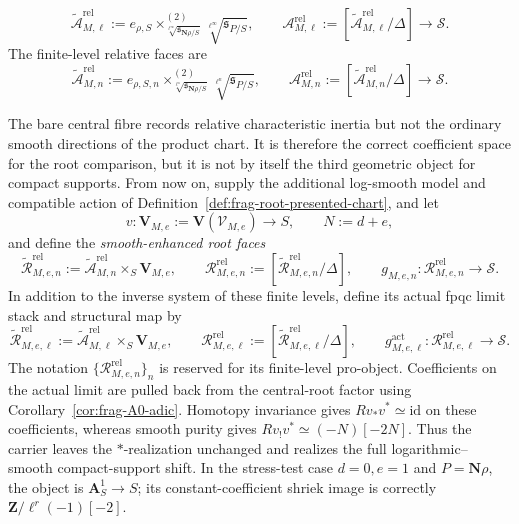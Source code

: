 \documentclass[11pt]{article}
\theoremstyle{definition}
\theoremstyle{remark}
\begin{document}
\begin{equation}
 \widetilde{\mathcal A}_{M,\ell}^{\mathrm{rel}}
 :=
 e_{\rho,S}\times^{(2)}_{\sqrt[\ell^\infty]{\mathfrak s_{\mathbf N\rho/S}}}
 \sqrt[\ell^\infty]{\mathfrak s_{P/S}},
 \qquad
 \mathcal A_{M,\ell}^{\mathrm{rel}}
 :=[\widetilde{\mathcal A}_{M,\ell}^{\mathrm{rel}}/\Delta]
 \longrightarrow\mathscr S.
 \label{eq:frag-proell-geometric-artin-face}
\end{equation}
The finite-level relative faces are
\[
 \widetilde{\mathcal A}_{M,n}^{\mathrm{rel}}
 :=
 e_{\rho,S,n}\times^{(2)}_{\sqrt[\ell^n]{\mathfrak s_{\mathbf N\rho/S}}}
 \sqrt[\ell^n]{\mathfrak s_{P/S}},
 \qquad
\mathcal A_{M,n}^{\mathrm{rel}}
 :=[\widetilde{\mathcal A}_{M,n}^{\mathrm{rel}}/\Delta]
 \longrightarrow\mathscr S.
\]

The bare central fibre records relative characteristic inertia but not the
ordinary smooth directions of the product chart.  It is therefore the correct
coefficient space for the root comparison, but it is not by itself the third geometric
object for compact supports.  From now on, supply the additional
log-smooth model and compatible action of
Definition~\ref{def:frag-root-presented-chart}, and let
\[
 v:\mathbf V_{M,e}:=\mathbf V(\mathcal V_{M,e})\longrightarrow S,
 \qquad N:=d+e,
\]
and define the \emph{smooth-enhanced root faces}
\begin{equation}
 \widetilde{\mathcal R}_{M,e,n}^{\mathrm{rel}}
 :=\widetilde{\mathcal A}_{M,n}^{\mathrm{rel}}
       \times_S\mathbf V_{M,e},
 \qquad
 \mathcal R_{M,e,n}^{\mathrm{rel}}
 :=[\widetilde{\mathcal R}_{M,e,n}^{\mathrm{rel}}/\Delta],
 \qquad
 g_{M,e,n}:\mathcal R_{M,e,n}^{\mathrm{rel}}\to\mathscr S.
 \label{eq:frag-smooth-enhanced-root-face}
\end{equation}
In addition to the inverse system of these finite levels, define its actual
fpqc limit stack and structural map by
\begin{equation}
 \widetilde{\mathcal R}_{M,e,\ell}^{\mathrm{rel}}
 :=\widetilde{\mathcal A}_{M,\ell}^{\mathrm{rel}}
       \times_S\mathbf V_{M,e},
 \qquad
 \mathcal R_{M,e,\ell}^{\mathrm{rel}}
 :=[\widetilde{\mathcal R}_{M,e,\ell}^{\mathrm{rel}}/\Delta],
 \qquad
 g_{M,e,\ell}^{\mathrm{act}}:
 \mathcal R_{M,e,\ell}^{\mathrm{rel}}\to\mathscr S .
 \label{eq:frag-actual-smooth-enhanced-root-face}
\end{equation}
The notation
$\{\mathcal R_{M,e,n}^{\mathrm{rel}}\}_n$ is reserved for its finite-level
pro-object.  Coefficients on the actual limit are pulled back from the
central-root factor using Corollary~\ref{cor:frag-A0-adic}.  Homotopy invariance gives
$Rv_*v^*\simeq\mathrm{id}$ on these coefficients, whereas smooth purity gives
$Rv_!v^*\simeq(-N)[-2N]$.  Thus the carrier leaves the $*$-realization
unchanged and realizes the full
logarithmic--smooth compact-support shift.  In the stress-test case
$d=0,e=1$ and $P=\mathbf N\rho$, the object is
$\mathbf A^1_S\to S$; its constant-coefficient shriek image is correctly
$\mathbf Z/\ell^r(-1)[-2]$.
\end{document}
